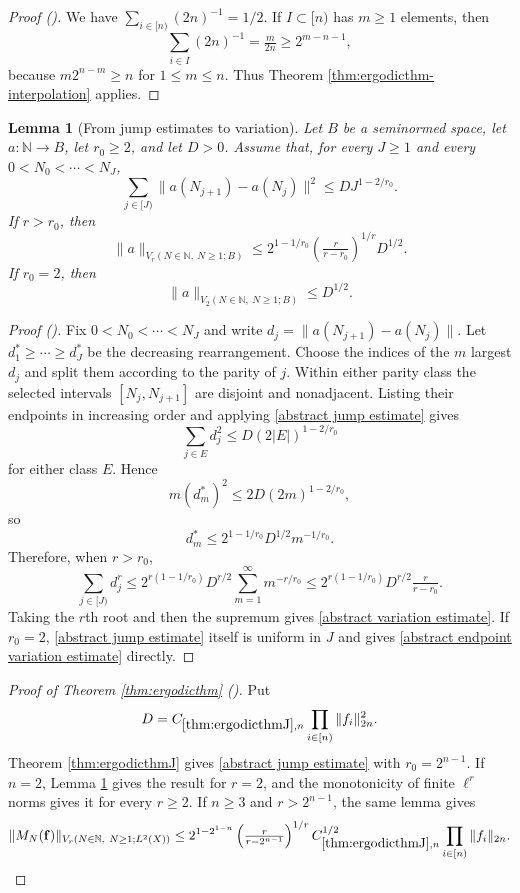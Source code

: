 \documentclass[12pt,reqno]{amsart}
\newcommand{\auto}{{({\tiny\faCar})}}
\theoremstyle{plain}
\newtheorem{lemma}[theorem]{Lemma}
\numberwithin{equation}{section}
\theoremstyle{remark}
\newcommand{\uses}[1]{}
\newcommand{\usesdefs}[1]{}
\newcommand{\N}{{\mathbb N}}
\begin{document}
\begin{proof}[Proof \auto]
We have $\sum_{i\in[n)}(2n)^{-1}=1/2$. If $I\subset[n)$ has $m\ge1$ elements, then
\[
\sum_{i\in I}(2n)^{-1}=\tfrac{m}{2n}\ge2^{m-n-1},
\]
because $m2^{n-m}\ge n$ for $1\le m\le n$. Thus Theorem \ref{thm:ergodicthm-interpolation} applies.
\end{proof}

\begin{lemma}[From jump estimates to variation]\label{jump estimates imply variation}\uses{}\usesdefs{}
Let $B$ be a seminormed space, let $a:\N\to B$, let $r_0\ge2$, and let $D>0$. Assume that, for every $J\ge1$ and every $0<N_0<\cdots<N_J$,
\begin{equation}\label{abstract jump estimate}
\sum_{j\in[J)}\|a(N_{j+1})-a(N_j)\|^2\le D J^{1-2/r_0}.
\end{equation}
If $r>r_0$, then
\begin{equation}\label{abstract variation estimate}
\|a\|_{V_r(N\in\N,\ N\ge1;B)}
\le 2^{1-1/r_0}\left(\tfrac{r}{r-r_0}\right)^{1/r}D^{1/2}.
\end{equation}
If $r_0=2$, then
\begin{equation}\label{abstract endpoint variation estimate}
\|a\|_{V_2(N\in\N,\ N\ge1;B)}\le D^{1/2}.
\end{equation}
\end{lemma}

\begin{proof}[Proof \auto]
Fix $0<N_0<\cdots<N_J$ and write $d_j=\|a(N_{j+1})-a(N_j)\|$. Let $d_1^*\ge\cdots\ge d_J^*$ be the decreasing rearrangement. Choose the indices of the $m$ largest $d_j$ and split them according to the parity of $j$. Within either parity class the selected intervals $[N_j,N_{j+1}]$ are disjoint and nonadjacent. Listing their endpoints in increasing order and applying \eqref{abstract jump estimate} gives
\[
\sum_{j\in E}d_j^2\le D(2|E|)^{1-2/r_0}
\]
for either class $E$. Hence
\[
m(d_m^*)^2\le 2D(2m)^{1-2/r_0},
\]
so
\[
d_m^*\le2^{1-1/r_0}D^{1/2}m^{-1/r_0}.
\]
Therefore, when $r>r_0$,
\[
\sum_{j\in[J)}d_j^r
\le2^{r(1-1/r_0)}D^{r/2}\sum_{m=1}^{\infty}m^{-r/r_0}
\le2^{r(1-1/r_0)}D^{r/2}\tfrac{r}{r-r_0}.
\]
Taking the $r$th root and then the supremum gives \eqref{abstract variation estimate}. If $r_0=2$, \eqref{abstract jump estimate} itself is uniform in $J$ and gives \eqref{abstract endpoint variation estimate} directly.
\end{proof}

\begin{proof}[Proof of Theorem \ref{thm:ergodicthm} \auto]
Put
\[
D=C_{\ref{thm:ergodicthmJ},n}\prod_{i\in[n)}\|f_i\|_{2n}^2.
\]
Theorem \ref{thm:ergodicthmJ} gives \eqref{abstract jump estimate} with $r_0=2^{n-1}$. If $n=2$, Lemma \ref{jump estimates imply variation} gives the result for $r=2$, and the monotonicity of finite $\ell^r$ norms gives it for every $r\ge2$. If $n\ge3$ and $r>2^{n-1}$, the same lemma gives
\[
\|M_N(\mathbf f)\|_{V_r(N\in\N,\ N\ge1;L^2(X))}
\le 2^{1-2^{1-n}}\left(\tfrac{r}{r-2^{n-1}}\right)^{1/r}
C_{\ref{thm:ergodicthmJ},n}^{1/2}
\prod_{i\in[n)}\|f_i\|_{2n}.
\]
\end{proof}
\end{document}
